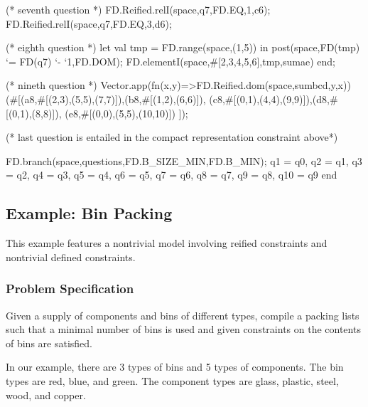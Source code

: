 \documentclass[a4paper,halfparskip]{scrartcl}
\begin{document}
\begin{myverbatim}
       (* seventh question *)
        FD.Reified.relI(space,q7,FD.EQ,1,c6);
        FD.Reified.relI(space,q7,FD.EQ,3,d6);
            
       (* eighth question *)
        let 
            val tmp = FD.range(space,(1,5))
        in 
            post(space,FD(tmp) `= FD(q7) `- `1,FD.DOM);
            FD.elementI(space,#[2,3,4,5,6],tmp,sumae)
        end;
            
       (* nineth question *)
        Vector.app(fn(x,y)=>FD.Reified.dom(space,sumbcd,y,x))
                 (#[(a8,#[(2,3),(5,5),(7,7)]),(b8,#[(1,2),(6,6)]),
                    (c8,#[(0,1),(4,4),(9,9)]),(d8,#[(0,1),(8,8)]),
                    (e8,#[(0,0),(5,5),(10,10)]) ]); 
          
        (* last question is entailed in the compact representation 
           constraint above*) 
            
        FD.branch(space,questions,FD.B_SIZE_MIN,FD.B_MIN);
       {q1 = q0, q2 = q1, q3 = q2, q4 = q3, q5 = q4, q6 = q5,
        q7 = q6, q8 = q7, q9 = q8, q10 = q9}
    end

\end{myverbatim}

\newpage
\subsection{Example: Bin Packing}
\label{sec8-4}
This example features a nontrivial model involving reified 
constraints and nontrivial defined constraints. 

\subsubsection{Problem Specification}
Given a supply of components and bins of different types, 
compile a packing lists such that a minimal number of bins 
is used and given constraints on the contents of bins are satisfied.

In our example, there are 3 types of bins and 5 types of components. 
The bin types are red, blue, and green. The component types are 
glass, plastic, steel, wood, and copper.
\end{document}
